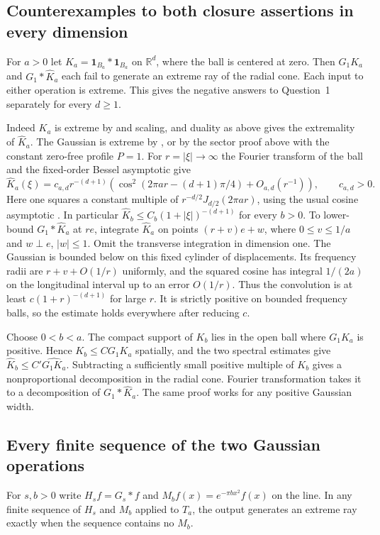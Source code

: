 \documentclass[11pt,a4paper]{article}
\numberwithin{equation}{section}
\begin{document}
\subsection{Counterexamples to both closure assertions in every dimension}
For $a>0$ let $K_a=\mathbf1_{B_a}*\mathbf1_{B_a}$ on $\mathbb R^d$, where the ball is centered at zero. Then $G_1K_a$ and $G_1*\widehat K_a$ each fail to generate an extreme ray of the radial cone. Each input to either operation is extreme. This gives the negative answers to Question~1 separately for every $d\ge1$.

Indeed $K_a$ is extreme by \cite[Cor.~3.3]{JMR2009} and scaling, and duality as above gives the extremality of $\widehat K_a$. The Gaussian is extreme by \cite[Sec.~4.2]{JMR2009}, or by the sector proof above with the constant zero-free profile $P=1$. For $r=|\xi|\to\infty$ the Fourier transform of the ball and the fixed-order Bessel asymptotic give
\[
 \widehat K_a(\xi)=c_{a,d}r^{-(d+1)}
 \left(\cos^2(2\pi a r-(d+1)\pi/4)+O_{a,d}(r^{-1})\right),
 \qquad c_{a,d}>0.
\]
Here one squares a constant multiple of $r^{-d/2}J_{d/2}(2\pi a r)$, using the usual cosine asymptotic \cite[Sec.~10.17]{DLMFBessel}. In particular $\widehat K_b\le C_b(1+|\xi|)^{-(d+1)}$ for every $b>0$. To lower-bound $G_1*\widehat K_a$ at $re$, integrate $\widehat K_a$ on points $(r+v)e+w$, where $0\le v\le 1/a$ and $w\perp e$, $|w|\le1$. Omit the transverse integration in dimension one. The Gaussian is bounded below on this fixed cylinder of displacements. Its frequency radii are $r+v+O(1/r)$ uniformly, and the squared cosine has integral $1/(2a)$ on the longitudinal interval up to an error $O(1/r)$. Thus the convolution is at least $c(1+r)^{-(d+1)}$ for large $r$. It is strictly positive on bounded frequency balls, so the estimate holds everywhere after reducing $c$.

Choose $0<b<a$. The compact support of $K_b$ lies in the open ball where $G_1K_a$ is positive. Hence $K_b\le C G_1K_a$ spatially, and the two spectral estimates give $\widehat K_b\le C'\widehat{G_1K_a}$. Subtracting a sufficiently small positive multiple of $K_b$ gives a nonproportional decomposition in the radial cone. Fourier transformation takes it to a decomposition of $G_1*\widehat K_a$. The same proof works for any positive Gaussian width.

\subsection{Every finite sequence of the two Gaussian operations}
For $s,b>0$ write $H_s f=G_s*f$ and $M_b f(x)=e^{-\pi b x^2}f(x)$ on the line. In any finite sequence of $H_s$ and $M_b$ applied to $T_a$, the output generates an extreme ray exactly when the sequence contains no $M_b$.
\end{document}
